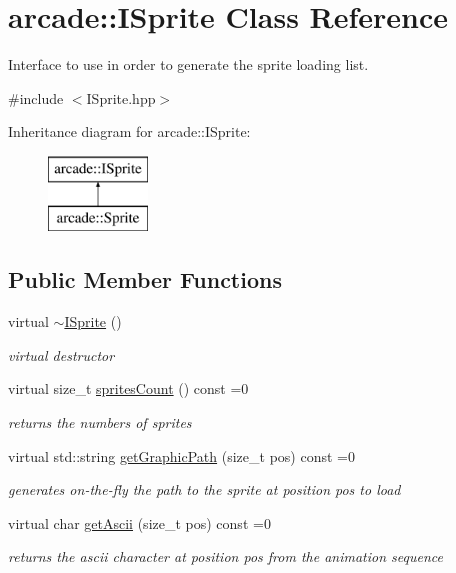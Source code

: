 \hypertarget{classarcade_1_1_i_sprite}{}\section{arcade\+:\+:I\+Sprite Class Reference}
\label{classarcade_1_1_i_sprite}


Interface to use in order to generate the sprite loading list.  




{\ttfamily \#include $<$I\+Sprite.\+hpp$>$}

Inheritance diagram for arcade\+:\+:I\+Sprite\+:\begin{figure}[H]
\begin{center}
\leavevmode
\includegraphics[height=2.000000cm]{classarcade_1_1_i_sprite}
\end{center}
\end{figure}
\subsection*{Public Member Functions}
\begin{DoxyCompactItemize}
\item 
virtual \hyperlink{classarcade_1_1_i_sprite_aa52abc5d79f3afa9ae82696d3bf9d3d3}{$\sim$\+I\+Sprite} ()
\begin{DoxyCompactList}\small\item\em virtual destructor \end{DoxyCompactList}\item 
virtual size\+\_\+t \hyperlink{classarcade_1_1_i_sprite_aa417a93a06968e42db16f8cbd2680c89}{sprites\+Count} () const =0
\begin{DoxyCompactList}\small\item\em returns the numbers of sprites \end{DoxyCompactList}\item 
virtual std\+::string \hyperlink{classarcade_1_1_i_sprite_ad47b6c128695746cd59e4b87435a7f09}{get\+Graphic\+Path} (size\+\_\+t pos) const =0
\begin{DoxyCompactList}\small\item\em generates on-\/the-\/fly the path to the sprite at position pos to load \end{DoxyCompactList}\item 
virtual char \hyperlink{classarcade_1_1_i_sprite_aa3ab1b0c35f865d38e82b6fb0abce20a}{get\+Ascii} (size\+\_\+t pos) const =0
\begin{DoxyCompactList}\small\item\em returns the ascii character at position pos from the animation sequence \end{DoxyCompactList}\end{DoxyCompactItemize}


